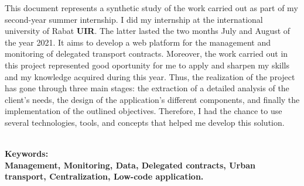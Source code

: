 \documentclass[a4paper]{report}
\begin{document}
\begin{doublespace}

    This document represents a synthetic study of the work carried out as part of my second-year summer internship.
    I did my internship at the international university of Rabat \textbf{UIR}. The latter lasted the two months
    July and August of the year 2021. It aims to develop a web platform for the management and monitoring of
    delegated transport contracts. Moreover, the work carried out in this project represented good oportunity
    for me to apply and sharpen my skills and my knowledge acquired during this year. Thus, the realization
    of the project has gone through three main stages: the extraction of a detailed analysis of the client's
    needs, the design of the application's different components, and finally the implementation of the outlined objectives.
    Therefore, I had the chance to use several technologies, tools, and concepts that helped me develop this solution.

    \textbf{\\Keywords:\\Management, Monitoring, Data, Delegated contracts, Urban transport, Centralization, Low-code application.}

\end{doublespace}

\newpage

\renewcommand{\contentsname}{Table de matières}
\setcounter{tocdepth}{4}
\tableofcontents

\cleardoublepage
\end{document}
